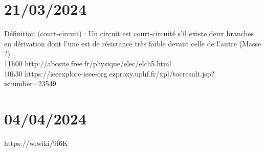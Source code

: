 \documentclass[11pt]{article}
\begin{document}
    \section{21/03/2024}
    Définition (court-circuit) : Un circuit est court-circuité s'il existe
    deux branches en dérivation dont l'une est de résistance très faible devant celle de l'autre (Masse ?)
    \\
    11h00 http://abcsite.free.fr/physique/elec/elch5.html
    \\
    10h30 https://ieeexplore-ieee-org.ezproxy.uphf.fr/xpl/tocresult.jsp?isnumber=23549

    \section{04/04/2024}
    https://w.wiki/9f6K \\
\end{document}
